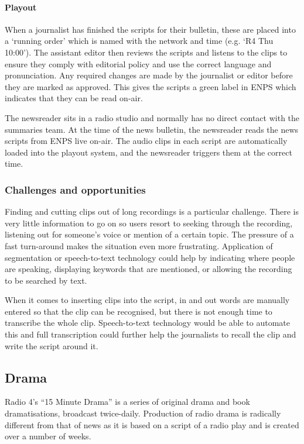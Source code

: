 \paragraph{Playout}
When a journalist has finished the scripts for their bulletin, these are placed into a `running order' which is named
with the network and time (e.g. `R4 Thu 10:00'). The assistant editor then reviews the scripts and listens to the clips
to ensure they comply with editorial policy and use the correct language and pronunciation.  Any required changes are
made by the journalist or editor before they are marked as approved. This gives the scripts a green label in ENPS which
indicates that they can be read on-air.

The newsreader sits in a radio studio and normally has no direct contact with the summaries team. At the time of the
news bulletin, the newsreader reads the news scripts from ENPS live on-air. The audio clips in each script are
automatically loaded into the playout system, and the newsreader triggers them at the correct time.

\subsubsection{Challenges and opportunities}
Finding and cutting clips out of long recordings is a particular challenge.  There is very little information to go on
so users resort to seeking through the recording, listening out for someone's voice or mention of a certain topic.  The
pressure of a fast turn-around makes the situation even more frustrating.  Application of segmentation or
speech-to-text technology could help by indicating where people are speaking, displaying keywords that are mentioned,
or allowing the recording to be searched by text.

When it comes to inserting clips into the script, in and out words are manually entered so that the clip can be
recognised, but there is not enough time to transcribe the whole clip. Speech-to-text technology would be able to
automate this and full transcription could further help the journalists to recall the clip and write the script around
it.

\subsection{Drama}\label{sec:drama}
Radio 4's ``15 Minute Drama'' is a series of original drama and book dramatisations, broadcast twice-daily. Production
of radio drama is radically different from that of news as it is based on a script of a radio play and is created over
a number of weeks.

